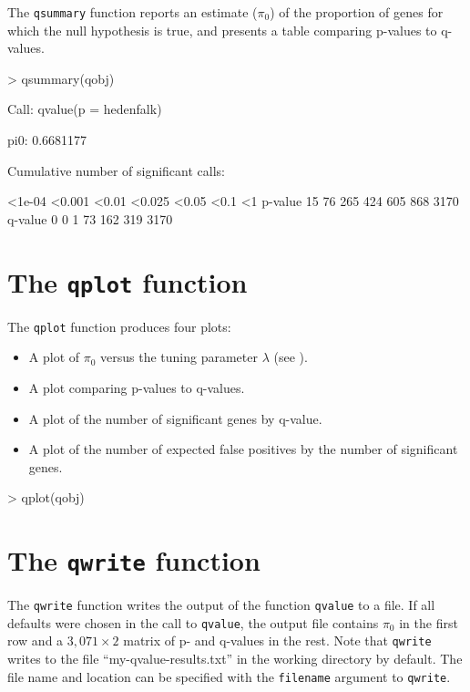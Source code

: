 \documentclass[11pt]{article}
\newcommand{\Rfunction}[1]{{\texttt{#1}}}
\newcommand{\Rfunarg}[1]{{\texttt{#1}}}
\begin{document}
The \Rfunction{qsummary} function reports an estimate ($\pi_0$) of the proportion of genes for which the null 
hypothesis is true, and presents a table comparing p-values to q-values.

\begin{Schunk}
\begin{Sinput}
> qsummary(qobj)
\end{Sinput}
\begin{Soutput}
Call:
qvalue(p = hedenfalk)

pi0:	0.6681177	

Cumulative number of significant calls:

        <1e-04 <0.001 <0.01 <0.025 <0.05 <0.1   <1
p-value     15     76   265    424   605  868 3170
q-value      0      0     1     73   162  319 3170
\end{Soutput}
\end{Schunk}

\section{The \Rfunction{qplot} function}

The \Rfunction{qplot} function produces four plots:
\begin{itemize}
\item A plot of $\pi_0$ versus the tuning parameter $\lambda$ (see \cite{storey:tibs:2003}).
\item A plot comparing p-values to q-values.
\item A plot of the number of significant genes by q-value.
\item A plot of the number of expected false positives by the number of significant genes.
\end{itemize}

\begin{Schunk}
\begin{Sinput}
> qplot(qobj)
\end{Sinput}
\end{Schunk}

\section{The \Rfunction{qwrite} function}

The \Rfunction{qwrite} function writes the output of the function \texttt{qvalue} to a file.  If all defaults 
were chosen in the call to \Rfunction{qvalue}, the output file contains $\pi_0$ in the first row and 
a $3,071 \times 2$ matrix of p- and q-values in the rest.  Note that \Rfunction{qwrite} writes to the file 
``my-qvalue-results.txt'' in the working directory by default.  The file name and location can be specified 
with the \Rfunarg{filename} argument to \Rfunction{qwrite}.
\end{document}
